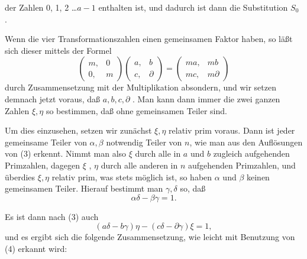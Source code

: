 der Zahlen 0, 1, 2 \dots $a - 1$ enthalten ist, und dadurch ist dann
die Substitution $S_0$ .

Wenn die vier Transformationszahlen einen gemeinsamen
Faktor haben, so läßt sich dieser mittels der Formel
\[
\begin{pmatrix}m, & 0\\0, & m\end{pmatrix}\begin{pmatrix}a, & b\\c, & \partial\end{pmatrix} = \begin{pmatrix}ma, & mb\\mc, & m\partial\end{pmatrix}
\]
durch Zusammensetzung mit der Multiplikation absondern, und
wir setzen demnach jetzt voraus, daß $a, b, c, \partial$ . Man kann dann immer die zwei
ganzen Zahlen $\xi, \eta$ so bestimmen, daß
ohne gemeinsamen Teiler sind.

Um dies einzusehen, setzen wir zunächst $\xi, \eta$ relativ prim
voraus. Dann ist jeder gemeinsame Teiler von $\alpha, \beta$ notwendig
Teiler von $n$, wie man aus den Auflösungen von (3)
erkennt. Nimmt man also $\xi$  durch alle in $a$
und $b$ zugleich aufgehenden Primzahlen, dagegen $\xi$ ,
$\eta$  durch alle anderen in $n$ aufgehenden Primzahlen,
und überdies $\xi, \eta$ relativ prim, was stets möglich ist, so haben
$\alpha$ und $\beta$ keinen gemeinsamen Teiler. Hierauf bestimmt man $\gamma, \delta$
so, daß
\[
\alpha\delta - \beta\gamma = 1.
\]

Es ist dann nach (3) auch
\[
(a\delta - b\gamma)\eta - (c\delta - \partial\gamma)\xi = 1,
\]
und es ergibt sich die folgende Zusammensetzung, wie leicht mit
Benutzung von (4) erkannt wird:

